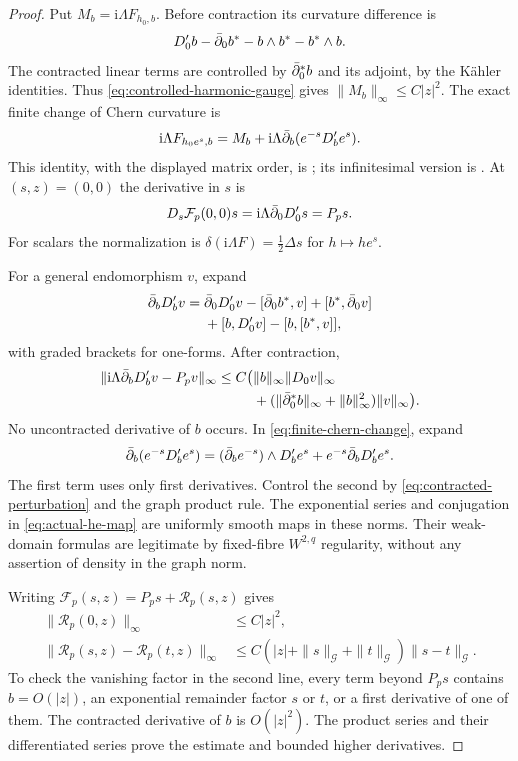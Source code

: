 \begin{proof}
Put $M_b=\mathrm i\Lambda F_{h_0,b}$.
Before contraction its curvature difference is
\[
 D_0'b-\bar\partial_0b^*-b\wedge b^*-b^*\wedge b.
\]
The contracted linear terms are controlled by
$\bar\partial_0^*b$ and its adjoint, by the Kähler identities.
Thus \eqref{eq:controlled-harmonic-gauge} gives
$\|M_b\|_\infty\le C|z|^2$.
The exact finite change of Chern curvature is
\begin{equation}\label{eq:finite-chern-change}
 \mathrm i\Lambda F_{h_0e^s,b}
       =M_b+\mathrm i\Lambda\bar\partial_b(e^{-s}D_b'e^s).
\end{equation}
This identity, with the displayed matrix order, is
\cite[(2.10)]{CLZZ}; its infinitesimal version is
\cite[(6.3.16)--(6.3.17)]{Kobayashi}.
At $(s,z)=(0,0)$ the derivative in $s$ is
\[
 D_s\mathcal F_p(0,0)s
       =\mathrm i\Lambda\bar\partial_0D_0's=P_ps.
\]
For scalars the normalization is
$\delta(\mathrm i\Lambda F)=\tfrac12\Delta s$ for
$h\mapsto he^s$.

For a general endomorphism $v$, expand
\[
 \begin{split}
 \bar\partial_bD_b'v={}&\bar\partial_0D_0'v-[\bar\partial_0b^*,v]
             +[b^*,\bar\partial_0v]\\
             &+[b,D_0'v]-[b,[b^*,v]],
 \end{split}
\]
with graded brackets for one-forms. After contraction,
\begin{equation}\label{eq:contracted-perturbation}
 \begin{split}
 \|\mathrm i\Lambda\bar\partial_bD_b'v-P_pv\|_\infty
 \le C\bigl(&\|b\|_\infty\|D_0v\|_\infty\\
 &+(\|\bar\partial_0^*b\|_\infty+\|b\|_\infty^2)\|v\|_\infty\bigr).
 \end{split}
\end{equation}
No uncontracted derivative of $b$ occurs.
In \eqref{eq:finite-chern-change}, expand
\[
 \bar\partial_b(e^{-s}D_b'e^s)
   =(\bar\partial_be^{-s})\wedge D_b'e^s
                            +e^{-s}\bar\partial_bD_b'e^s.
\]
The first term uses only first derivatives. Control the
second by \eqref{eq:contracted-perturbation} and the graph
product rule. The exponential series and conjugation in
\eqref{eq:actual-he-map} are uniformly smooth maps in
these norms. Their weak-domain formulas are legitimate
by fixed-fibre $W^{2,q}$ regularity, without any assertion
of density in the graph norm.

Writing $\mathcal F_p(s,z)=P_ps+\mathcal R_p(s,z)$ gives
\begin{equation}\label{eq:he-remainder}
 \begin{aligned}
 \|\mathcal R_p(0,z)\|_\infty&\le C|z|^2,\\
 \|\mathcal R_p(s,z)-\mathcal R_p(t,z)\|_\infty
  &\le C(|z|+\|s\|_{\mathcal G}+\|t\|_{\mathcal G})
                                      \|s-t\|_{\mathcal G}.
 \end{aligned}
\end{equation}
To check the vanishing factor in the second line, every
term beyond $P_ps$ contains $b=O(|z|)$, an exponential
remainder factor $s$ or $t$, or a first derivative of
one of them. The contracted derivative of $b$ is
$O(|z|^2)$. The product series and their differentiated
series prove the estimate and bounded higher derivatives.


\end{proof}
